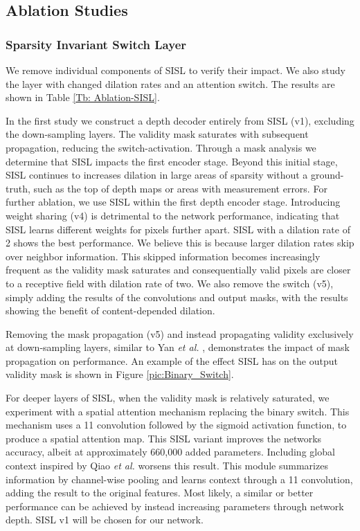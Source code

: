 \documentclass[letterpaper, 10 pt, conference]{ieeeconf}  \usepackage{geometry}
\begin{document}
\subsection{Ablation Studies}
\subsubsection{Sparsity Invariant Switch Layer}
We remove individual components of SISL to verify their impact. We also study the layer with changed dilation rates and an attention switch. The results are shown in Table \ref{Tb: Ablation-SISL}. 

In the first study we construct a depth decoder entirely from SISL (v1), excluding the down-sampling layers. The validity mask saturates with subsequent propagation, reducing the switch-activation. Through a mask analysis we determine that SISL impacts the first encoder stage. Beyond this initial stage, SISL continues to increases dilation in large areas of sparsity without a ground-truth, such as the top of depth maps or areas with measurement errors. For further ablation, we use SISL within the first depth encoder stage. Introducing weight sharing (v4) is detrimental to the network performance, indicating that SISL learns different weights for pixels further apart. SISL with a dilation rate of 2 shows the best performance. We believe this is because larger dilation rates skip over neighbor information. This skipped information becomes increasingly frequent as the validity mask saturates and consequentially valid pixels are closer to a receptive field with dilation rate of two. We also remove the switch (v5), simply adding the results of the convolutions and output masks, with the results showing the benefit of content-depended dilation.

Removing the mask propagation (v5) and instead propagating validity exclusively at down-sampling layers, similar to Yan \textit{et al.} \cite{Revisiting_Sparsity}, demonstrates the impact of mask propagation on performance. An example of the effect SISL has on the output validity mask is shown in Figure \ref{pic:Binary_Switch}. 

For deeper layers of SISL, when the validity mask is relatively saturated, we experiment with a spatial attention mechanism replacing the binary switch. This mechanism uses a 11 convolution followed by the sigmoid activation function, to produce a spatial attention map. This SISL variant improves the networks accuracy, albeit at approximately 660,000 added parameters. Including global context inspired by Qiao \textit{et al.} \cite{DetectoRS} worsens this result. This module summarizes information by channel-wise pooling and learns context through a 11 convolution, adding the result to the original features. Most likely, a similar or better performance can be achieved by instead increasing parameters through network depth. SISL v1 will be chosen for our network.
\end{document}
